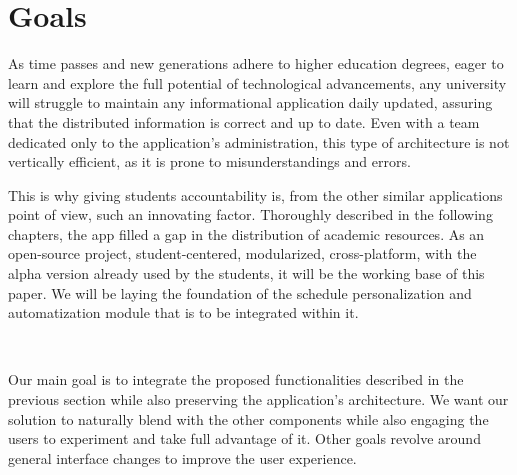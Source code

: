 \section{Goals} \label{1:goals}
As time passes and new generations adhere to higher education degrees, eager to learn and explore the full potential of technological advancements, any university will struggle to maintain any informational application daily updated, assuring that the distributed information is correct and up to date. Even with a team dedicated only to the application’s administration, this type of architecture is not vertically efficient, as it is prone to misunderstandings and errors. 

This is why giving students accountability is, from the other similar applications point of view, such an innovating factor.
Thoroughly described in the following chapters, the app filled a gap in the distribution of academic resources. As an open-source project, student-centered, modularized, cross-platform, with the alpha version already used by the students, it will be the working base of this paper. We will be laying the foundation of the schedule personalization and automatization module that is to be integrated within it.

~

Our main goal is to integrate the proposed functionalities described in the previous section while also preserving the application’s architecture. We want our solution to naturally blend with the other components while also engaging the users to experiment and take full advantage of it.
Other goals revolve around general interface changes to improve the user experience.


